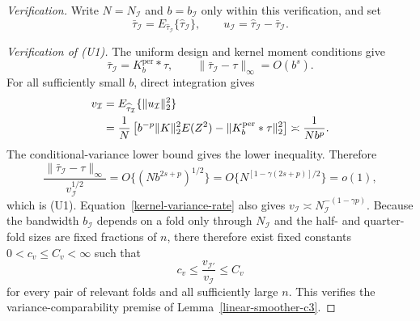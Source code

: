 \documentclass[11pt]{article}
\theoremstyle{referenceplain}
\theoremstyle{referencedefinition}
\theoremstyle{referenceremark}
\begin{document}
\begin{proof}[Verification]
Write $N=N_{\mathcal I}$ and $b=b_{\mathcal I}$ only within this verification, and set
\[
\bar\tau_{\mathcal I}
=E_{\widehat\tau_{\mathcal I}}
\{\widehat\tau_{\mathcal I}\},
\qquad
u_{\mathcal I}=\widehat\tau_{\mathcal I}-\bar\tau_{\mathcal I}.
\]

\medskip\noindent\textit{Verification of (U1).}
The uniform design and kernel moment conditions give
\[
\bar\tau_{\mathcal I}=K_b^{\mathrm{per}}*\tau,
\qquad
\|\bar\tau_{\mathcal I}-\tau\|_\infty=O(b^s).
\]
For all sufficiently small $b$, direct integration gives
\begin{align}
v_{\mathcal I}
&=E_{\widehat\tau_{\mathcal I}}
\{\|u_{\mathcal I}\|_2^2\}\notag\\
&=\frac1N\left[
b^{-p}\|K\|_2^2E(Z^2)
-\|K_b^{\mathrm{per}}*\tau\|_2^2
\right]
\asymp\frac1{Nb^p}.
\label{kernel-variance-rate}
\end{align}
The conditional-variance lower bound gives the lower inequality. Therefore
\[
\frac{\|\bar\tau_{\mathcal I}-\tau\|_\infty}{v_{\mathcal I}^{1/2}}
=O\{(Nb^{2s+p})^{1/2}\}
=O\{N^{[1-\gamma(2s+p)]/2}\}=o(1),
\]
which is (U1). Equation~\eqref{kernel-variance-rate} also gives
$v_{\mathcal I}\asymp N_{\mathcal I}^{-(1-\gamma p)}$. Because the bandwidth
$b_{\mathcal I}$ depends on a fold only through $N_{\mathcal I}$ and the
half- and quarter-fold sizes are fixed fractions of $n$, there therefore exist
fixed constants $0<c_v\le C_v<\infty$ such that
\[
c_v
\le \frac{v_{\mathcal I'}}{v_{\mathcal I}}
\le C_v
\]
for every pair of relevant folds and all sufficiently large $n$. This verifies
the variance-comparability premise of
Lemma~\ref{linear-smoother-c3}.


\end{proof}
\end{document}

